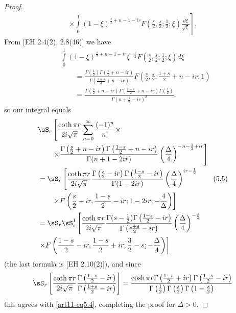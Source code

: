 \begin{proof}
\begin{multline*}
\left.  \times \int\limits^1_0 (1-\xi)^{\frac{s}{2} + n -1 - ir} F\left(\frac{s}{2}, \frac{s}{2}; \frac{1}{2}; \xi \right) \frac{d\xi}{\sqrt{\xi}} \right].
\end{multline*}
From [EH 2.4(2), 2.8(46)] we have 
\begin{align*}
& \int\limits^1_0 (1-\xi)^{\frac{s}{2} + n - 1 - ir} \xi^{-\frac{1}{2}} F\left(\frac{s}{2}, \frac{s}{2} ; \frac{1}{2}; \xi  \right) d \xi\\
&\qquad = \frac{\Gamma \left(\frac{1}{2} \right)  \Gamma \left(\frac{s}{2}+ n - ir \right)}{
\Gamma \left(\frac{1+s}{2} + n - ir \right)} F \left(\frac{s}{2} , \frac{s}{2}; \frac{1+s}{2} + n -ir; 1 \right) \\
&\qquad = \frac{\Gamma \left(\frac{s}{2} + n - ir \right) \Gamma \left(\frac{1-s}{2} + n - ir \right) \Gamma \left(\frac{1}{2} \right)}{\Gamma \left(n+ \frac{1}{2} -ir \right)^2},
\end{align*}
so our integral equals 
\begin{align*}
& \sS_r \left[ \frac{\coth \pi r}{2 i \sqrt{\pi}} \sum\limits^\infty_{n=0} \frac{(-1)^n}{n!}  \times  \right.\\
& \qquad \left.\times \frac{\Gamma \left(\frac{s}{2} + n - ir \right)\Gamma \left(\frac{1-s}{2} + n - ir \right)}{\Gamma (n+ 1 - 2 ir)} \left(\frac{\Delta}{4} \right)^{-n -\frac{1}{2} + ir} \right]\\
& = \sS_r \left[ \frac{\coth \pi r }{2i \sqrt{\pi}} \frac{\Gamma \left(\frac{s}{2} - ir \right) \Gamma \left(\frac{1-s}{2} - ir \right)}{\Gamma (1 - 2 ir)} \left(\frac{\Delta}{4} \right)^{ir - \frac{1}{2}}\right. \tag{5.5}\label{art11-eq5.5}\\
&\quad \quad \left.  \times F \left(\frac{s}{2} - ir , \frac{1-s}{2} - ir; 1 - 2 ir ; -\frac{4}{\Delta} \right)\right]\\
& = \sS_r \sS^1_s \left[\frac{\coth \pi r}{ 2 i \sqrt{\pi}} \frac{\Gamma (s - \frac{1}{2}) \Gamma \left(\frac{1-s}{2} -ir \right) }{\Gamma \left(\frac{1+s}{2} - ir \right)} \left(\frac{\Delta}{4} \right)^{-\frac{s}{2}} \right. \\ 
& \left. \times F \left(\frac{1-s}{2} - ir, \frac{1-s}{2} + ir; \frac{3}{2} - s ; -\frac{\Delta}{4} \right)\right]
\end{align*}
(the last formula is [EH 2.10(2)]), and since 
$$
\sS_r \left[\frac{\coth \pi r}{2 i \sqrt{\pi}} \frac{\Gamma \left(\frac{1-s}{2} -ir \right)}{\Gamma \left(\frac{1+s}{2} -ir\right)} \right] = \frac{\cosh \pi r \Gamma \left(\frac{1-s}{2} + ir \right) \Gamma \left(\frac{1-s}{2} -ir \right)}{ \Gamma \left(\frac{1}{2} \right) \Gamma \left(\frac{s}{2} \right) \Gamma \left(1-\frac{s}{2} \right)}
$$
this agrees with \eqref{art11-eq5.4}, completing the proof for $\Delta > 0$.


\end{proof}
